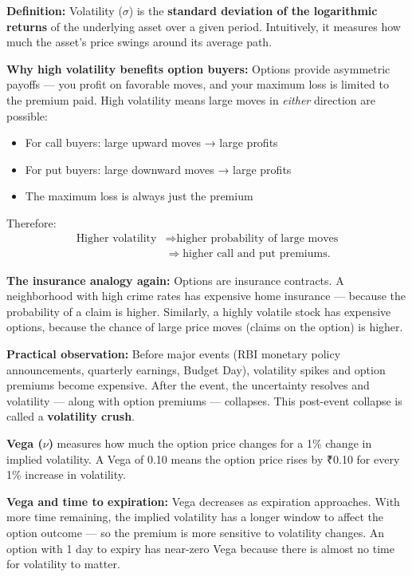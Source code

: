 \documentclass[12pt,openany]{book}
\theoremstyle{definition}
\theoremstyle{remark}
\begin{document}
\textbf{Definition:} Volatility (\(\sigma\)) is the \textbf{standard deviation of the logarithmic returns} of the underlying asset over a given period. Intuitively, it measures how much the asset's price swings around its average path.

\textbf{Why high volatility benefits option buyers:} Options provide asymmetric payoffs --- you profit on favorable moves, and your maximum loss is limited to the premium paid. High volatility means large moves in \emph{either} direction are possible:

\begin{itemize}
\item For call buyers: large upward moves → large profits


\item For put buyers: large downward moves → large profits


\item The maximum loss is always just the premium


\end{itemize}
Therefore:
\[
\begin{aligned}
\text{Higher volatility}
&\Rightarrow \text{higher probability of large moves}\\
&\Rightarrow \text{higher call and put premiums}.
\end{aligned}
\]

\textbf{The insurance analogy again:} Options are insurance contracts. A neighborhood with high crime rates has expensive home insurance --- because the probability of a claim is higher. Similarly, a highly volatile stock has expensive options, because the chance of large price moves (claims on the option) is higher.

\textbf{Practical observation:} Before major events (RBI monetary policy announcements, quarterly earnings, Budget Day), volatility spikes and option premiums become expensive. After the event, the uncertainty resolves and volatility --- along with option premiums --- collapses. This post-event collapse is called a \textbf{volatility crush}.

\textbf{Vega (\(\nu\))} measures how much the option price changes for a 1\% change in implied volatility. A Vega of 0.10 means the option price rises by ₹0.10 for every 1\% increase in volatility.

\textbf{Vega and time to expiration:} Vega decreases as expiration approaches. With more time remaining, the implied volatility has a longer window to affect the option outcome --- so the premium is more sensitive to volatility changes. An option with 1 day to expiry has near-zero Vega because there is almost no time for volatility to matter.
\end{document}
